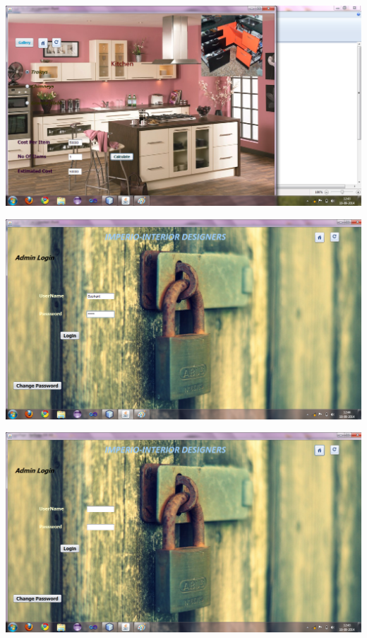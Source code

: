 \documentclass[12pt,a4paper]{report}
\begin{document}
\begin{center}
\includegraphics[scale=0.45]{9.png}
\end{center}
\begin{center}
\includegraphics[scale=0.45]{9_1.png}
\end{center}
\begin{center}
\includegraphics[scale=0.45]{10.png}
\end{center}
\end{document}
